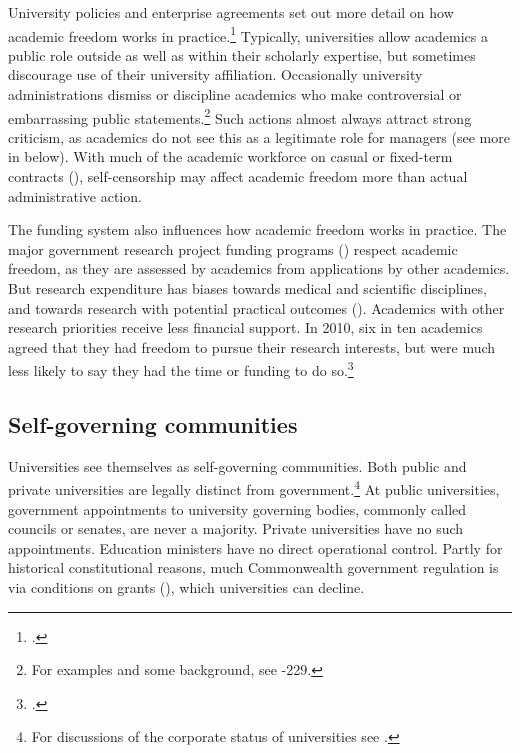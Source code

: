 \documentclass{grattan}
\begin{document}
University policies and enterprise agreements set out more detail on how academic freedom works in practice.\footcites[][]{Stobbs2015academicfreedoman}[][]{Gelber2018asmelbourneuniver} Typically, universities allow academics a public role outside as well as within their scholarly expertise, but sometimes discourage use of their university affiliation. Occasionally university administrations dismiss or discipline academics who make controversial or embarrassing public statements.\footnote{For examples and some background, see \textcites[][]{Jackson2005expressrightstoa}[][223]{OBrien2015nationaltertiarye}-229.} Such actions almost always attract strong criticism, as academics do not see this as a legitimate role for managers (see more in  below). With much of the academic workforce on casual or fixed-term contracts (), self-censorship may affect academic freedom more than actual administrative action.

The funding system also influences how academic freedom works in practice. The major government research project funding programs () respect academic freedom, as they are assessed by academics from applications by other academics. But research expenditure has biases towards medical and scientific disciplines, and towards research with potential practical outcomes (). Academics with other research priorities receive less financial support. In 2010, six in ten academics agreed that they had freedom to pursue their research interests, but were much less likely to say they had the time or funding to do so.\footcite[][66]{Bexley2013themotivationsva}

%
\subsection{Self-governing communities}\label{subsec:self-governing-communities}

Universities see themselves as self-governing communities. Both public and private universities are legally distinct from government.\footnote{For discussions of the corporate status of universities see \textcites[][]{Corcoran2000firstprinciplesin}[][]{Orr2012australiancorporat}.} At public universities, government appointments to university governing bodies, commonly called councils or senates, are never a majority. Private universities have no such appointments. Education ministers have no direct operational control. Partly for historical constitutional reasons, much Commonwealth government regulation is via conditions on grants (), which universities can decline.
\end{document}
